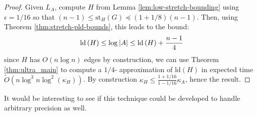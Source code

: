 \begin{proof}Given $L_{A}$, compute $H$ from Lemma \ref{lem:low-stretch-bounding}
using $\epsilon=1/16$ so that $\left(n-1\right)\leq\text{st}_{H}\left(G\right)\preceq\left(1+1/8\right)\left(n-1\right)$.
Then, using Theorem \ref{thm:stretch-pld-bounds}, this leads to the
bound: 
\[
\text{\text{ld}}\left(H\right)\leq\log\left|A\right|\leq\text{ld}\left(H\right)+\frac{n-1}{4}
\]
since $H$ has $O\left(n\log n\right)$ edges by construction, we
can use Theorem \ref{thm:ultra_main} to compute a $1/4$- approximation
of $\text{ld}\left(H\right)$ in expected time $\tilde{O}\left(n\log^{3}n\log^{2}\left(\kappa_{H}\right)\right)$.
By construction $\kappa_{H}\leq\frac{1+1/16}{1-1/16}\kappa_{A}$,
hence the result.

\end{proof}

It would be interesting to see if this technique could be developed
to handle arbitrary precision as well. 
